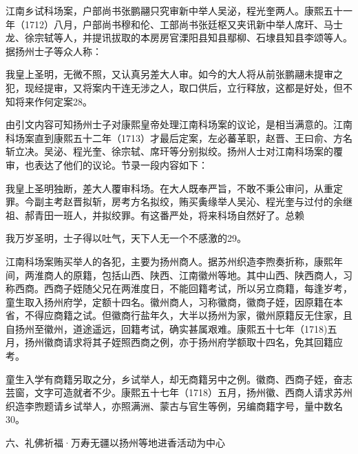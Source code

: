 江南乡试科场案，户部尚书张鹏翮只究审新中举人吴泌，程光奎两人。康熙五十一年（1712）八月，户部尚书穆和伦、工部尚书张廷枢又夹讯新中举人席玕、马士龙、徐宗轼等人，并提讯拔取的本房房官溧阳县知县鄢柳、石埭县知县李颂等人。据扬州士子等众人称：

\begin{BookQuote}
我皇上圣明，无微不照，又认真另差大人审。如今的大人将从前张鹏翮未提审之犯，现经提审，又将案内干连无涉之人，取口供后，立行释放，这都是好处，但不知将来作何定案28。
\end{BookQuote}

由引文内容可知扬州士子对康熙皇帝处理江南科场案的议论，是相当满意的。江南科场案直到康熙五十二年（1713）才最后定案，左必蕃革职，赵晋、王曰俞、方名斩立决。吴泌、程光奎、徐宗轼、席玕等分别拟绞。扬州人士对江南科场案的覆审，也表达了他们的议论。节录一段内容如下：

\begin{BookQuote}
我皇上圣明独断，差大人覆审科场。在大人既奉严旨，不敢不秉公审问，从重定罪。今副主考赵晋拟斩，房考方名拟绞，贿买夤缘举人吴沁、程光奎与过付的余继祖、郝青田一班人，并拟绞罪。有这番严处，将来科场自然好了。总赖
\end{BookQuote}

\vfill
\begin{BookNotes}
\end{BookNotes}

\begin{BookQuote}
我万岁圣明，士子得以吐气，天下人无一个不感激的29。
\end{BookQuote}

江南科场案贿买举人的各犯，主要为扬州商人。据苏州织造李煦奏折称，康熙年间，两淮商人的原籍，包括山西、陕西、江南徽州等地。其中山西、陕西商人，习称西商。西商子姪随父兄在两淮度日，不能回籍考试，所以另立商籍，每逢岁考，童生取入扬州府学，定额十四名。徽州商人，习称徽商，徽商子姪，因原籍在本省，不得应商籍之试。但徽商行盐年久，大半以扬州为家，徽州原籍反无住家，且自扬州至徽州，道途遥远，回籍考试，确实甚属艰难。康熙五十七年（1718)五月，扬州徽商请求将其子姪照西商之例，亦于扬州府学额取十四名，免其回籍应考。

童生入学有商籍另取之分，乡试举人，却无商籍另中之例。徽商、西商子姪，奋志芸窗，文字可造就者不少。康熙五十七年（1718）五月，扬州徽、西商人请求苏州织造李煦题请乡试举人，亦照满洲、蒙古与官生等例，另编商籍字号，量中数名30。

\begin{BookQuote}
六、礼佛祈福·万寿无疆以扬州等地进香活动为中心
\end{BookQuote}

